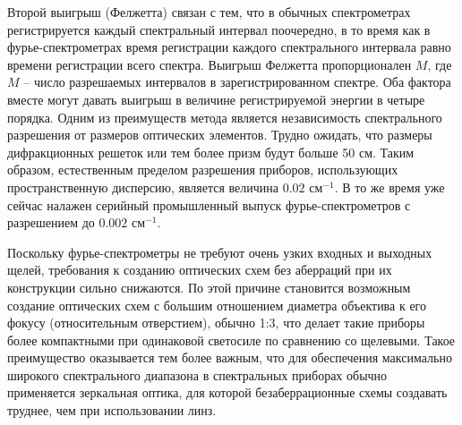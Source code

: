 Второй выигрыш (Фелжетта) связан с тем, что в обычных спектрометрах регистрируется каждый спектральный интервал поочередно, в то время как в фурье-спектрометрах время регистрации каждого
спектрального интервала равно времени регистрации всего спектра.
Выигрыш Фелжетта пропорционален $M$, где $M$ – число разрешаемых
интервалов в зарегистрированном спектре.  Оба фактора вместе могут
давать выигрыш в величине регистрируемой энергии в четыре порядка.
Одним из преимуществ метода является независимость спектрального разрешения от размеров оптических элементов. Трудно ожидать,
что размеры дифракционных решеток или тем более призм будут больше 50 см. Таким образом, естественным пределом разрешения приборов, использующих пространственную дисперсию, является величина
$0.02$ см$^{-1}$. В то же время уже сейчас налажен серийный промышленный выпуск фурье-спектрометров с разрешением до $0.002$ см$^{-1}$.

Поскольку фурье-спектрометры не требуют очень узких входных и
выходных щелей, требования к созданию оптических схем без аберраций при их конструкции сильно снижаются. По этой причине становится возможным создание оптических схем с большим отношением
диаметра объектива к его фокусу (относительным отверстием), обычно 1:3, что делает такие приборы более компактными при одинаковой
светосиле по сравнению со щелевыми. Такое преимущество оказывается тем более важным, что для обеспечения максимально широкого
спектрального диапазона в спектральных приборах обычно применяется зеркальная оптика, для которой безаберрационные схемы создавать
труднее, чем при использовании линз.


